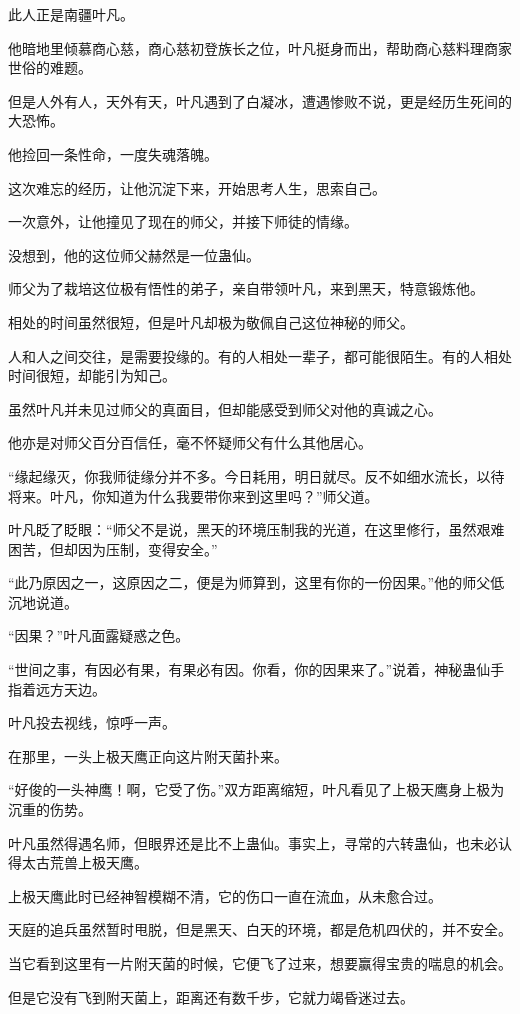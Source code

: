 \begin{this_body}
此人正是南疆叶凡。

他暗地里倾慕商心慈，商心慈初登族长之位，叶凡挺身而出，帮助商心慈料理商家世俗的难题。

但是人外有人，天外有天，叶凡遇到了白凝冰，遭遇惨败不说，更是经历生死间的大恐怖。

他捡回一条性命，一度失魂落魄。

这次难忘的经历，让他沉淀下来，开始思考人生，思索自己。

一次意外，让他撞见了现在的师父，并接下师徒的情缘。

没想到，他的这位师父赫然是一位蛊仙。

师父为了栽培这位极有悟性的弟子，亲自带领叶凡，来到黑天，特意锻炼他。

相处的时间虽然很短，但是叶凡却极为敬佩自己这位神秘的师父。

人和人之间交往，是需要投缘的。有的人相处一辈子，都可能很陌生。有的人相处时间很短，却能引为知己。

虽然叶凡并未见过师父的真面目，但却能感受到师父对他的真诚之心。

他亦是对师父百分百信任，毫不怀疑师父有什么其他居心。

“缘起缘灭，你我师徒缘分并不多。今日耗用，明日就尽。反不如细水流长，以待将来。叶凡，你知道为什么我要带你来到这里吗？”师父道。

叶凡眨了眨眼：“师父不是说，黑天的环境压制我的光道，在这里修行，虽然艰难困苦，但却因为压制，变得安全。”

“此乃原因之一，这原因之二，便是为师算到，这里有你的一份因果。”他的师父低沉地说道。

“因果？”叶凡面露疑惑之色。

“世间之事，有因必有果，有果必有因。你看，你的因果来了。”说着，神秘蛊仙手指着远方天边。

叶凡投去视线，惊呼一声。

在那里，一头上极天鹰正向这片附天菌扑来。

“好俊的一头神鹰！啊，它受了伤。”双方距离缩短，叶凡看见了上极天鹰身上极为沉重的伤势。

叶凡虽然得遇名师，但眼界还是比不上蛊仙。事实上，寻常的六转蛊仙，也未必认得太古荒兽上极天鹰。

上极天鹰此时已经神智模糊不清，它的伤口一直在流血，从未愈合过。

天庭的追兵虽然暂时甩脱，但是黑天、白天的环境，都是危机四伏的，并不安全。

当它看到这里有一片附天菌的时候，它便飞了过来，想要赢得宝贵的喘息的机会。

但是它没有飞到附天菌上，距离还有数千步，它就力竭昏迷过去。


\end{this_body}
